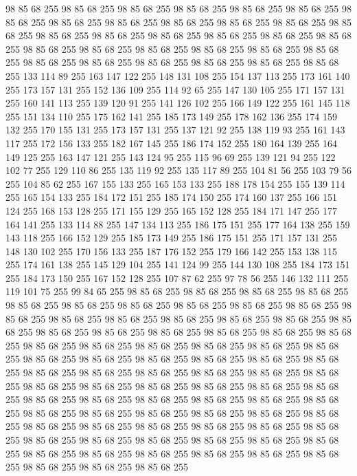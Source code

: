98 85 68 255 98 85 68 255 98 85 68 255 98 85 68 255 98 85 68 255 98 85 68 255 98 85 68 255 98 85 68 255 98 85 68 255 98 85 68 255 98 85 68 255 98 85 68 255 98 85 68 255 98 85 68 255 98 85 68 255 98 85 68 255 98 85 68 255 98 85 68 255 98 85 68 255 98 85 68 255 98 85 68 255 98 85 68 255 98 85 68 255 98 85 68 255 98 85 68 255 98 85 68 255 98 85 68 255 98 85 68 255 98 85 68 255 98 85 68 255 98 85 68 255 133 114 89 255 163 147 122 255 148 131 108 255 154 137 113 255 173 161 140 255 173 157 131 255 152 136 109 255 114 92 65 255 147 130 105 255 171 157 131 255 160 141 113 255 139 120 91 255 141 126 102 255 166 149 122 255 161 145 118 255 151 134 110 255 175 162 141 255 185 173 149 255 178 162 136 255 174 159 132 255 170 155 131 255 173 157 131 255 137 121 92 255 138 119 93 255 161 143 117 255 172 156 133 255 182 167 145 255 186 174 152 255 180 164 139 255 164 149 125 255 163 147 121 255 143 124 95 255 115 96 69 255
139 121 94 255 122 102 77 255 129 110 86 255 135 119 92 255 135 117 89 255 104 81 56 255 103 79 56 255 104 85 62 255 167 155 133 255 165 153 133 255 188 178 154 255 155 139 114 255 165 154 133 255 184 172 151 255 185 174 150 255 174 160 137 255 166 151 124 255 168 153 128 255 171 155 129 255 165 152 128 255 184 171 147 255 177 164 141 255 133 114 88 255 147 134 113 255 186 175 151 255 177 164 138 255 159 143 118 255 166 152 129 255 185 173 149 255 186 175 151 255 171 157 131 255 148 130 102 255 170 156 133 255 187 176 152 255 179 166 142 255 153 138 115 255 174 161 138 255 145 129 104 255 141 124 99 255 144 130 108 255 184 173 151 255 184 173 150 255 167 152 128 255 107 87 62 255 97 78 56 255 146 132 111 255 119 101 75 255 99 84 65 255 98 85 68 255 98 85 68 255 98 85 68 255 98 85 68 255 98 85 68 255 98 85 68 255 98 85 68 255 98 85 68 255 98 85 68 255 98 85 68 255 98 85 68 255 98 85 68 255 98 85 68 255 98 85 68 255 98 85 68 255 98 85 68 255
98 85 68 255 98 85 68 255 98 85 68 255 98 85 68 255 98 85 68 255 98 85 68 255 98 85 68 255 98 85 68 255 98 85 68 255 98 85 68 255 98 85 68 255 98 85 68 255 98 85 68 255 98 85 68 255 98 85 68 255 98 85 68 255 98 85 68 255 98 85 68 255 98 85 68 255 98 85 68 255 98 85 68 255 98 85 68 255 98 85 68 255 98 85 68 255 98 85 68 255 98 85 68 255 98 85 68 255 98 85 68 255 98 85 68 255 98 85 68 255 98 85 68 255 98 85 68 255 98 85 68 255 98 85 68 255 98 85 68 255 98 85 68 255 98 85 68 255 98 85 68 255 98 85 68 255 98 85 68 255 98 85 68 255 98 85 68 255 98 85 68 255 98 85 68 255 98 85 68 255 98 85 68 255 98 85 68 255 98 85 68 255 98 85 68 255 98 85 68 255 98 85 68 255 98 85 68 255 98 85 68 255 98 85 68 255 98 85 68 255 98 85 68 255 98 85 68 255 98 85 68 255 98 85 68 255 98 85 68 255 98 85 68 255 98 85 68 255 98 85 68 255 98 85 68 255
